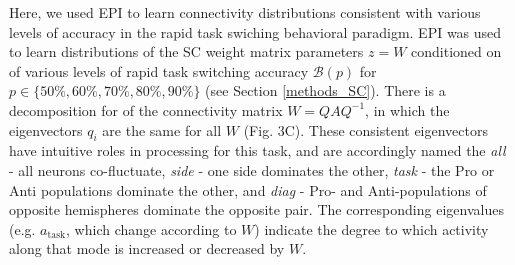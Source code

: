 \documentclass[11pt]{article}
\begin{document}
Here, we used EPI to learn connectivity distributions consistent with various levels of accuracy in the rapid task swiching behavioral paradigm.  EPI was used to learn distributions of the SC weight matrix parameters $z = W$ conditioned on of various levels of rapid task switching accuracy $\mathcal{B}(p)$ for $p \in \{50\%, 60\%, 70\%, 80\%, 90\%\}$ (see Section \ref{methods_SC}).  There is a decomposition for of the connectivity matrix $W = QAQ^{-1}$, in which the eigenvectors $q_i$ are the same for all $W$ (Fig. 3C).
These consistent eigenvectors have intuitive roles in processing for this task, and are accordingly named the \textit{all} - all neurons co-fluctuate, \textit{side} - one side dominates the other, \textit{task} - the Pro or Anti populations dominate the other, and \textit{diag} - Pro- and Anti-populations of opposite hemispheres dominate the opposite pair. The corresponding eigenvalues (e.g. $a_{\text{task}}$, which change according to $W$) indicate the degree to which activity along that mode is increased or decreased by $W$.  
\end{document}
